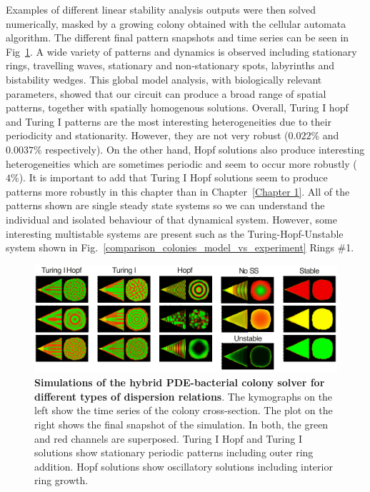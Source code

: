 Examples of different linear stability analysis outputs were then solved numerically, masked by a growing colony obtained with the cellular automata algorithm.
The different final pattern snapshots and time series can be seen in Fig~\ref{system_class_simulations}.
A wide variety of patterns and dynamics is observed including stationary rings, travelling waves, stationary and non-stationary spots, labyrinths and bistability wedges.
This global model analysis, with biologically relevant parameters, showed that our circuit can produce a broad range of spatial patterns, together with spatially homogenous solutions.
Overall, Turing I hopf and Turing I patterns are the most interesting heterogeneities due to their periodicity and stationarity.
However, they are not very robust ($0.022\%$ and $0.0037\%$ respectively).
On the other hand, Hopf solutions also produce interesting heterogeneities which are sometimes periodic and seem to occur more robustly ($4\%$).
It is important to add that Turing I Hopf solutions seem to produce patterns more robustly in this chapter than in Chapter~\ref{Chapter 1}.
All of the patterns shown are single steady state systems so we can understand the individual and isolated behaviour of that dynamical system.
However, some interesting multistable systems are present such as the Turing-Hopf-Unstable system shown in Fig.~\ref{comparison_colonies_model_vs_experiment} Rings \#1.
\begin{figure}[H]
    \centering

    \includegraphics[width=1\textwidth]{chapters/Chapter 3/system_class_simulations}
    \caption{\textbf{Simulations of the hybrid PDE-bacterial colony solver for different types of dispersion relations}. The kymographs on the left show the time series of the colony cross-section. The plot on the right shows the final snapshot of the simulation. In both, the green and red channels are superposed. Turing I Hopf and Turing I solutions show stationary periodic patterns including outer ring addition. Hopf solutions show oscillatory solutions including interior ring growth.}
    \label{system_class_simulations}
\end{figure}


